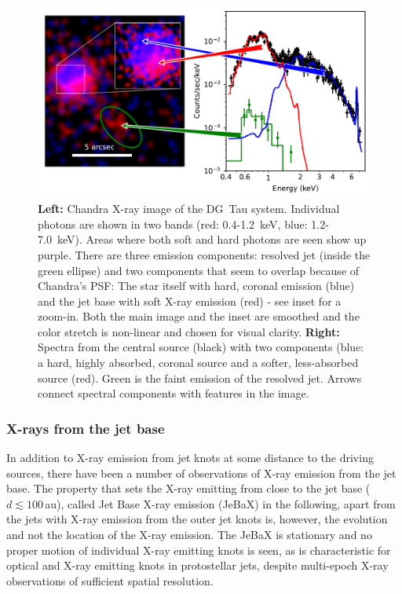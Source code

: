 \documentclass[graybox, nosecnum]{svmult}
\begin{document}
\begin{figure}[t]

\includegraphics[width=\textwidth]{figs/DGTau.pdf}
\caption{{\bf Left: } Chandra X-ray image of the DG~Tau system. Individual photons are shown in two bands (red: 0.4-1.2~keV, blue: 1.2-7.0~keV). Areas where both soft and hard photons are seen show up purple. There are three emission components: resolved jet (inside the green ellipse) and two components that seem to overlap because of Chandra's PSF: The star itself with hard, coronal emission (blue) and the jet base with soft X-ray emission (red) - see inset for a zoom-in. Both the main image and the inset are smoothed  and the color stretch is non-linear and chosen for visual clarity.
         {\bf Right: } Spectra from the central source (black) with two components (blue: a hard, highly absorbed, coronal source and a softer, less-absorbed source (red). Green is the faint emission of the resolved jet. Arrows connect spectral components with features in the image. \label{fig:dg_tau_X}}
\end{figure}

\subsubsection{X-rays from the jet base}
In addition to X-ray emission from jet knots at some distance to the driving sources, there have been a number of observations of X-ray emission from the jet base. The property that sets the X-ray emitting from close to the jet base  ($d\lesssim100\,$au), called Jet Base X-ray emission (JeBaX) in the following, apart from the jets with X-ray emission from the outer jet knots is, however, the  evolution  and not the location of the X-ray emission. The JeBaX is stationary and no proper motion of individual X-ray emitting knots is seen, as is characteristic for optical and X-ray emitting knots in protostellar jets, despite multi-epoch X-ray observations of sufficient spatial resolution.
\end{document}
